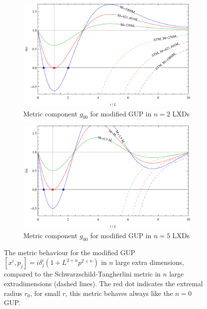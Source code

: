 \documentclass[10pt,a4paper]{article}
\begin{document}
\begin{figure} 
\begin{subfigure}{\textwidth}
\caption{Metric component $g_00$ for modified GUP in $n=2$ LXDs}
\includegraphics[scale=1]{figures/g00-n2.pdf}
\end{subfigure}
\begin{subfigure}{\textwidth}
\caption{Metric component $g_00$ for modified GUP in $n=5$ LXDs}
\includegraphics[scale=1]{figures/g00-n5.pdf}
\end{subfigure}
\caption{The metric behaviour for the modified GUP $[x^i, p_j] = i\delta^i_j (1+L^{2+n} p^{2+n})$ in $n$ large
extra dimensions, compared to the Schwarzschild-Tangherlini metric in $n$ large extradimensions (dashed lines).
The red dot indicates the extremal radius $r_0$, for small $r$, this metric behaves always like the $n=0$ GUP.%
}\label{fig:g00}
\end{figure}
\end{document}
